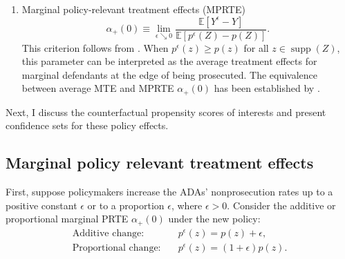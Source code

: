 \documentclass[11pt]{article}
\theoremstyle{definition}
\DeclareMathOperator*{\supp}{supp}
\newcommand{\Exp}{\ensuremath{\mathbb{E}}} %
\newcommand{\0}{\ensuremath{\mathbf{0}}}
\begin{document}
\begin{bibunit}
\begin{enumerate}
\item Marginal policy-relevant treatment effects (MPRTE)
\begin{equation}
\label{eq:marginal_policy_effects}
	\alpha_{+}(0) \equiv \lim_{\epsilon \searrow 0} \frac{ \Exp[Y^\epsilon - Y]}{\Exp[p^{\epsilon}(Z) - p(Z)]}.
\end{equation}
This criterion follows from \cite{carneiro/heckman/vytlacil:2010}. When $p^{\epsilon}(z) \geq p(z)$ for all $z\in\supp(Z)$, this parameter can be interpreted as the average treatment effects for marginal defendants at the edge of being prosecuted. The equivalence between average MTE and MPRTE $\alpha_+(0)$ has been established by \cite{carneiro/heckman/vytlacil:2010}. 
\end{enumerate}

Next, I discuss the counterfactual propensity scores of interests and present confidence sets for these policy effects. 


\subsection{Marginal policy relevant treatment effects}
\label{sec:PRTE}
First, suppose policymakers increase the ADAs' nonprosecution rates up to a positive constant $\epsilon$ or to a proportion $\epsilon$, where $\epsilon > 0$.  Consider the additive or proportional marginal PRTE $\alpha_+(0)$ under the new policy:
\begin{align}
	\label{eq:PRTE-additive}
	\text{Additive change:} \quad & p^{\epsilon}(z) = p(z) + \epsilon, \\
	\label{eq:PRTE-prop}
	\text{Proportional change:} \quad  & p^{\epsilon}(z) = (1 + \epsilon) p(z).
\end{align}




\end{bibunit}
\end{document}
